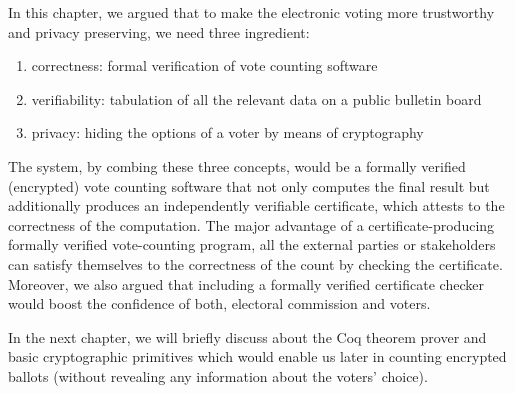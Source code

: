 In this chapter, we argued that to make the electronic voting  more trustworthy 
and privacy preserving, we need three ingredient: 
\begin{enumerate}
   \item correctness: formal verification of vote counting software
   \item verifiability: tabulation of all the relevant data on a public bulletin board
   \item privacy: hiding the options of a voter by means of cryptography 
\end{enumerate}
\noindent 
The system,  by combing these three concepts,  would be a formally 
verified (encrypted) vote counting software that not only computes the 
final result but additionally produces an independently verifiable certificate, 
which attests to the correctness of the computation.  The major advantage of 
a certificate-producing formally verified vote-counting program,  all the external
parties or stakeholders can satisfy themselves to the
correctness of the count by checking the certificate.  
Moreover, we also argued 
that including a formally verified certificate checker would boost the confidence 
of both,  electoral commission and voters. 
  
In the next chapter, we will  briefly discuss about the Coq theorem prover and basic cryptographic primitives which 
would enable us later in counting encrypted ballots (without revealing any information about the
voters' choice).